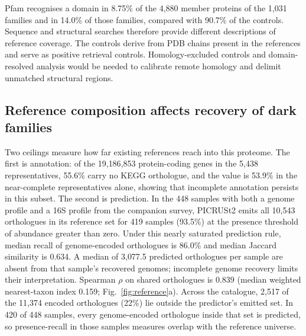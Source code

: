 \documentclass[11pt]{article}
\begin{document}
Pfam recognises a domain in 8.75\% of the 4{,}880 member proteins of the 1{,}031 families and
in 14.0\% of those families, compared with 90.7\% of the controls. Sequence and structural
searches therefore provide different descriptions of reference coverage. The controls derive
from PDB chains present in the references and serve as positive retrieval controls. Homology-excluded
controls and domain-resolved analysis would be needed to calibrate remote homology and delimit
unmatched structural regions.

\subsection*{Reference composition affects recovery of dark families}

Two ceilings measure how far existing references reach into this proteome. The first is
annotation: of the 19{,}186{,}853 protein-coding genes in the 5{,}438 representatives, 55.6\% carry
no KEGG orthologue, and the value is 53.9\% in the near-complete representatives alone, showing that incomplete annotation persists in this subset. The second is prediction. In the 448
samples with both a genome profile and a 16S profile from the companion survey, PICRUSt2
emits all 10{,}543 orthologues in its reference set for 419 samples (93.5\%) at the presence
threshold of abundance greater than zero. Under this nearly saturated prediction rule,
median recall of genome-encoded orthologues is 86.0\% and median Jaccard similarity is 0.634.
A median of 3{,}077.5 predicted orthologues per sample are absent from that sample's recovered
genomes; incomplete genome recovery limits their interpretation. Spearman $\rho$ on shared
orthologues is 0.839 (median weighted nearest-taxon index 0.159; Fig.~\ref{fig:reference}a).
Across the catalogue, 2{,}517 of the 11{,}374 encoded orthologues (22\%) lie outside the predictor's
emitted set. In 420 of 448 samples, every genome-encoded orthologue inside that set is predicted,
so presence-recall in those samples measures overlap with the reference universe.
\end{document}
